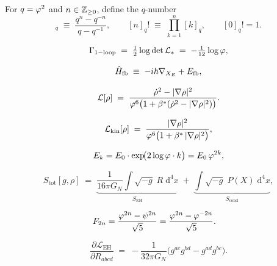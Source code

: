 \begin{definition}
\label{P10:def:q_numbers}
For $q = \varphi^2$ and $n\in\mathbb{Z}_{\geq0}$, define the $q$-number
\begin{equation}
  [n]_q \;\equiv\; \frac{q^n - q^{-n}}{q - q^{-1}},
  \qquad
  [n]_q! \;\equiv\; \prod_{k=1}^n [k]_q,
  \qquad [0]_q! = 1.
  \label{P10:eq:q_numbers}
\end{equation}
\end{definition}

\begin{equation}
  \Gamma_\mathrm{1-loop}
  \;=\; \tfrac{1}{2}\log\det\mathcal{L}_*
  \;=\; -\tfrac{1}{12}\log\varphi,
  \label{P10:eq:Gamma_1loop}
\end{equation}

\begin{equation}
  \hat{H}_\mathrm{fb}
  \;\equiv\; -i\hbar\nabla_{X_E} + E_{\mathrm{fb}},
  \label{P10:eq:Hfb}
\end{equation}

\begin{equation}
  \mathcal{L}[\rho]
  \;=\; \frac{\dot\rho^2 - |\nabla\rho|^2}{\varphi^6
         \bigl(1+\beta^{*}(\dot\rho^2-|\nabla\rho|^2)\bigr)}.
  \label{P10:eq:L_full}
\end{equation}

\begin{equation}
  \mathcal{L}_\mathrm{kin}[\rho]
  \;=\; \frac{|\nabla\rho|^2}{\varphi^6\bigl(1+\beta^{*}\,|\nabla\rho|^2\bigr)},
  \label{P10:eq:Lkin}
\end{equation}

\begin{equation}
  E_k = E_0\cdot\exp\!\bigl(2\log\varphi\cdot k\bigr) = E_0\,\varphi^{2k},
  \label{P10:eq:WZW_energy}
\end{equation}

\begin{equation}
  S_\mathrm{tot}[g,\rho]
  \;=\; \underbrace{\frac{1}{16\pi G_N}\int\!\sqrt{-g}\;R\;\mathrm{d}^4x}_{S_\mathrm{EH}}
  \;+\; \underbrace{\int\!\sqrt{-g}\;P(X)\;\mathrm{d}^4x}_{S_\mathrm{cond}},
  \label{P10:eq:action_total}
\end{equation}

\begin{align}
  F_{2n}
  &= \frac{\varphi^{2n} - \psi^{2n}}{\sqrt{5}}
   = \frac{\varphi^{2n} - \varphi^{-2n}}{\sqrt{5}}.
  \label{P10:eq:binet_even}
\end{align}

\begin{equation}
  \frac{\partial\mathcal{L}_\mathrm{EH}}{\partial R_{abcd}}
  \;=\; -\frac{1}{32\pi G_N}
  \bigl(g^{ac}g^{bd} - g^{ad}g^{bc}\bigr).
  \label{P10:eq:dLEH}
\end{equation}


